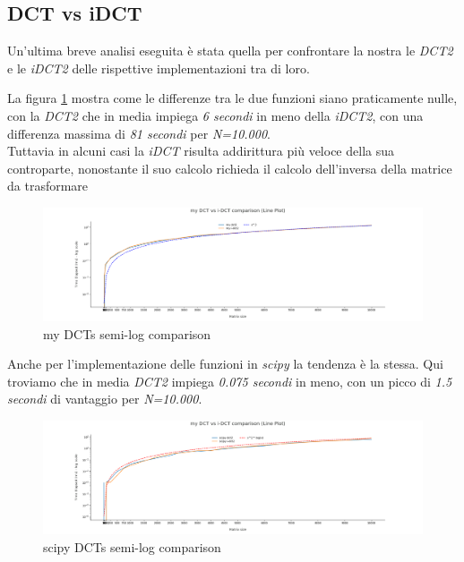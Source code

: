 \subsection{DCT vs iDCT}

Un'ultima breve analisi eseguita è stata quella per confrontare la nostra le \textit{DCT2} e le \textit{iDCT2} delle rispettive implementazioni tra di loro.

La figura \ref{fig:my_dcts_log_comparison} mostra come le differenze tra le due funzioni siano praticamente nulle, con la \textit{DCT2} che in media impiega \textit{6 secondi} in meno della \textit{iDCT2}, con una differenza massima di \textit{81 secondi} per \textit{N=10.000}.\\
Tuttavia in alcuni casi la \textit{iDCT} risulta addirittura più veloce della sua controparte, nonostante il suo calcolo richieda il calcolo dell'inversa della matrice da trasformare

\begin{figure}[H]
\hspace*{-2cm} \includegraphics[scale=0.4]{figs/DCT Comparison/my_dcts_log_comparison.png}
    \caption{my DCTs semi-log comparison}
    \label{fig:my_dcts_log_comparison}
\end{figure}

Anche per l'implementazione delle funzioni in \textit{scipy} la tendenza è la stessa. Qui troviamo che in media \textit{DCT2} impiega \textit{0.075 secondi} in meno, con un picco di \textit{1.5 secondi} di vantaggio per \textit{N=10.000}.\\

\begin{figure}[H]
\hspace*{-2cm} \includegraphics[scale=0.4]{figs/DCT Comparison/scipy_dcts_log_comparison.png}
    \caption{scipy DCTs semi-log comparison}
    \label{fig:scipy_dcts_log_comparison}
\end{figure}